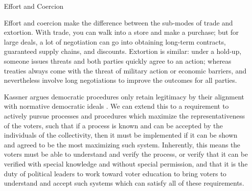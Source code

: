 \begin{definition}{Effort and Coercion}



Effort and coercion make the difference between the sub-modes of trade and extortion.  With trade, you can walk into a store and make a purchase; but for large deals, a lot of negotiation can go into obtaining long-term contracts, guaranteed supply chains, and discounts.  Extortion is similar:  under a hold-up, someone issues threats and both parties quickly agree to an action; whereas treaties always come with the threat of military action or economic barriers, and nevertheless involve long negotiations to improve the outcomes for all parties.
\end{definition}

Kassner argues democratic procedures only retain legitimacy by their alignment with normative democratic ideals \autocite{Kassner2006}.  We can extend this to a requirement to actively pursue processes and procedures which maximize the representativeness of the voters, such that if a process is known and can be accepted by the individuals of the collectivity, then it must be implemented if it can be shown and agreed to be the most maximizing such system.  Inherently, this means the voters must be able to understand and verify the process, or verify that it can be verified with special knowledge and without special permission, and that it is the duty of political leaders to work toward voter education to bring voters to understand and accept such systems which can satisfy all of these requirements.

